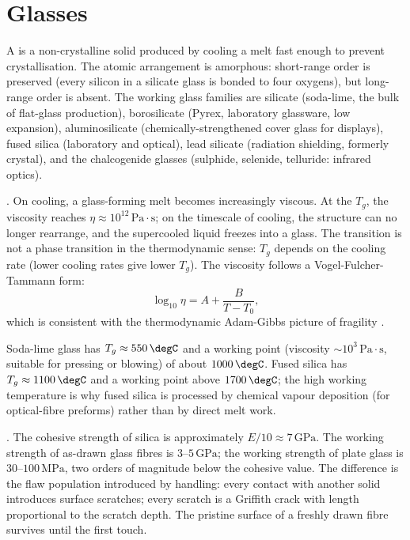\section{Glasses}

A  is a non-crystalline solid produced by cooling a
melt fast enough to prevent crystallisation. The atomic arrangement is
amorphous: short-range order is preserved (every silicon in a silicate
glass is bonded to four oxygens), but long-range order is absent. The
working glass families are silicate (soda-lime, the bulk of flat-glass
production), borosilicate (Pyrex, laboratory glassware, low expansion),
aluminosilicate (chemically-strengthened cover glass for displays),
fused silica (laboratory and optical), lead silicate (radiation
shielding, formerly crystal), and the chalcogenide glasses (sulphide,
selenide, telluride: infrared optics).

. On cooling, a glass-forming melt
becomes increasingly viscous. At the  $T_g$, the viscosity reaches $\eta \approx 10^{12}\,
\text{Pa}\cdot\text{s}$; on the timescale of cooling, the structure can
no longer rearrange, and the supercooled liquid freezes into a glass.
The transition is not a phase transition in the thermodynamic sense:
$T_g$ depends on the cooling rate (lower cooling rates give lower
$T_g$). The viscosity follows a Vogel-Fulcher-Tammann form:
\[
\log_{10}\eta = A + \frac{B}{T - T_0},
\]
which is consistent with the thermodynamic Adam-Gibbs picture of
fragility \cite[ch.~3]{text:kingery-ceramics}.

Soda-lime glass has $T_g \approx 550\,\degC$ and a working point
(viscosity $\sim 10^3\,\text{Pa}\cdot\text{s}$, suitable for pressing
or blowing) of about $1000\,\degC$. Fused silica has $T_g \approx
1100\,\degC$ and a working point above $1700\,\degC$; the high working
temperature is why fused silica is processed by chemical vapour
deposition (for optical-fibre preforms) rather than by direct melt
work.

. The cohesive
strength of silica is approximately $E/10 \approx 7\,\text{GPa}$. The
working strength of as-drawn glass fibres is $3$--$5\,\text{GPa}$; the
working strength of plate glass is $30$--$100\,\text{MPa}$, two orders
of magnitude below the cohesive value. The difference is the flaw
population introduced by handling: every contact with another solid
introduces surface scratches; every scratch is a Griffith crack with
length proportional to the scratch depth. The pristine surface of a
freshly drawn fibre survives until the first touch.

